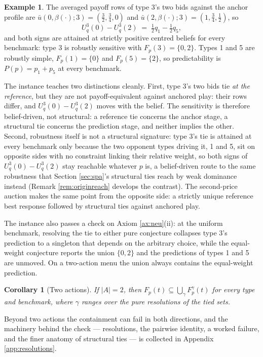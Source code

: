 \documentclass[12pt]{article}
\newtheorem{corollary}{Corollary}
\theoremstyle{definition}
\newtheorem{example}{Example}
\begin{document}
\begin{example}\label{ex:tied}
The averaged payoff rows of type 3's two bids against the anchor profile are $\bar u(0, \beta(\cdot); 3) = (\tfrac32, \tfrac34, 0)$ and $\bar u(2, \beta(\cdot); 3) = (1, \tfrac34, \tfrac12)$, so
\[
U^3_q(0) - U^3_q(2) \;=\; \tfrac12 q_1 - \tfrac12 q_5 ,
\]
and both signs are attained at strictly positive centred beliefs for every benchmark: type 3 is robustly sensitive with $F_p(3) = \{0, 2\}$. Types 1 and 5 are robustly simple, $F_p(1) = \{0\}$ and $F_p(5) = \{2\}$, so predictability is $P(p) = p_1 + p_5$ at every benchmark. 
\end{example}

The instance teaches two distinctions cleanly. First, type 3's two bids tie \emph{at the reference}, but they are not payoff-equivalent against anchored play: their rows differ, and $U^3_q(0) - U^3_q(2)$ moves with the belief. The sensitivity is therefore belief-driven, not structural: a reference tie concerns the anchor stage, a structural tie concerns the prediction stage, and neither implies the other. Second, robustness itself is not a structural signature: type 3's tie is attained at every benchmark only because the two opponent types driving it, 1 and 5, sit on opposite sides with no constraint linking their relative weight, so both signs of $U^3_q(0) - U^3_q(2)$ stay reachable whatever $p$ is, a belief-driven route to the same robustness that Section \ref{sec:spa}'s structural ties reach by weak dominance instead (Remark \ref{rem:originreach} develops the contrast). The second-price auction makes the same point from the opposite side: a strictly unique reference best response followed by structural ties against anchored play.

The instance also passes a check on Axiom \ref{ax:neu}(ii): at the uniform benchmark, resolving the tie to either pure conjecture collapses type 3's prediction to a singleton that depends on the arbitrary choice, while the equal-weight conjecture reports the union $\{0,2\}$ and the predictions of types 1 and 5 are unmoved. On a two-action menu the union always contains the equal-weight prediction.

\begin{corollary}[Two actions]\label{cor:binary}
If $|A| = 2$, then $F_p(t) \subseteq \bigcup_{\gamma} F^{\gamma}_p(t)$ for every type and benchmark, where $\gamma$ ranges over the pure resolutions of the tied sets.
\end{corollary}

Beyond two actions the containment can fail in both directions, and the machinery behind the check --- resolutions, the pairwise identity, a worked failure, and the finer anatomy of structural ties --- is collected in Appendix \ref{app:resolutions}.
\end{document}
